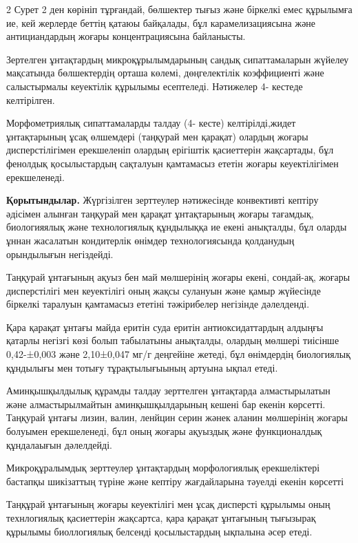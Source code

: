 \begin{multicols}{2}
Сурет 2 ден көрініп тұрғандай, бөлшектер тығыз және біркелкі емес
құрылымға ие, кей жерлерде беттің қатаюы байқалады, бұл
карамелизациясына және антициандардың жоғары концентрациясына
байланысты.

Зертелген ұнтақтардың микроқұрылымдарының сандық сипаттамаларын жүйелеу
мақсатында бөлшектердің орташа көлемі, дөңгелектілік коэффициенті және
салыстырмалы кеуектілік құрылымы есептеледі. Нәтижелер 4- кестеде
келтірілген.

Морфометриялық сипаттамаларды талдау (4- кесте) келтірілді,жидет
ұнтақтарының ұсақ өлшемдері (таңқурай мен қарақат) олардың жоғары
дисперстілігімен ерекшеленіп олардың ерігіштік қасиеттерін жақсартады,
бұл фенолдық қосылыстардың сақталуын қамтамасыз ететін жоғары
кеуектілігімен ерекшеленеді.

{\bfseries Қорытындылар.} Жүргізілген зерттеулер нәтижесінде конвективті
кептіру әдісімен алынған таңқурай мен қарақат ұнтақтарының жоғары
тағамдық, биологияялық және технологиялық құндылыққа ие екені анықталды,
бұл оларды ұннан жасалатын кондитерлік өнімдер технологиясында
қолданудың орындылығын негіздейді.

Таңқурай ұнтағының ақуыз бен май мөлшерінің жоғары екені, сондай-ақ,
жоғары дисперстілігі мен кеуектілігі оның жақсы сулануын және қамыр
жүйесінде біркелкі таралуын қамтамасыз ететіні тәжірибелер негізінде
дәлелденді.

Қара қарақат ұнтағы майда еритін суда еритін антиоксидаттардың алдыңғы
қатарлы негізгі көзі болып табылатыны анықталды, олардың мөлшері
тиісінше 0,42-±0,003 және 2,10±0,047 мг/г деңгейіне жетеді, бұл
өнімдердің биологиялық құндылығы мен тотығу тұрақтылығыының артуына
ықпал етеді.

Аминқышқылдылық құрамды талдау зерттелген ұнтақтарда алмастырылатын және
алмастырылмайтын аминқышқылдарының кешені бар екенін көрсетті. Таңқурай
ұнтағы лизин, валин, ленйцин серин жәнек аланин мөлшерінің жоғары
болуымен ерекшеленеді, бұл оның жоғары ақуыздық және функционалдық
құндалаығын дәлелдейді.

Микроқұралымдық зерттеулер ұнтақтардың морфологиялық ерекшеліктері
бастапқы шикізаттың түріне және кептіру жағдайларына тәуелді екенін
көрсетті

Таңқұрай ұнтағының жоғары кеуектілігі мен ұсақ дисперсті құрылымы оның
технлогиялық қасиеттерін жақсартса, қара қарақат ұнтағының тығызырақ
құрылымы биоллогиялық белсенді қосылыстардың ықпалына әсер етеді.


\end{multicols}

